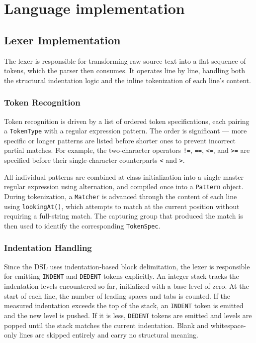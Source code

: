 \chapter{Language implementation}

\section{Lexer Implementation}

The lexer is responsible for transforming raw source text into a flat sequence of tokens, which the parser then consumes. It operates line by line, handling both the structural indentation logic and the inline tokenization of each line's content.

\subsection{Token Recognition}

Token recognition is driven by a list of ordered token specifications, each pairing a \texttt{TokenType} with a regular expression pattern. The order is significant --- more specific or longer patterns are listed before shorter ones to prevent incorrect partial matches. For example, the two-character operators \texttt{!=}, \texttt{==}, \texttt{<=}, and \texttt{>=} are specified before their single-character counterparts \texttt{<} and \texttt{>}.

All individual patterns are combined at class initialization into a single master regular expression using alternation, and compiled once into a \texttt{Pattern} object. During tokenization, a \texttt{Matcher} is advanced through the content of each line using \texttt{lookingAt()}, which attempts to match at the current position without requiring a full-string match. The capturing group that produced the match is then used to identify the corresponding \texttt{TokenSpec}.

\subsection{Indentation Handling}

Since the DSL uses indentation-based block delimitation, the lexer is responsible for emitting \texttt{INDENT} and \texttt{DEDENT} tokens explicitly. 
An integer stack tracks the indentation levels encountered so far, initialized with a base level of zero. At the start of each line, the number of leading spaces and tabs is counted. 
If the measured indentation exceeds the top of the stack, an \texttt{INDENT} token is emitted and the new level is pushed. If it is less, \texttt{DEDENT} tokens are emitted and levels are popped until the stack matches the current indentation. 
Blank and whitespace-only lines are skipped entirely and carry no structural meaning.

